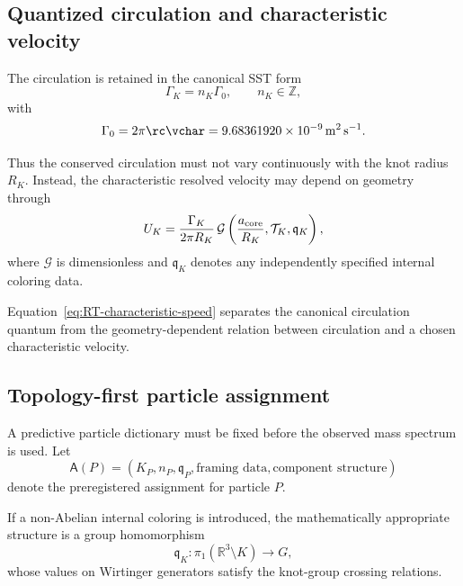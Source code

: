 \subsection{Quantized circulation and characteristic velocity}

The circulation is retained in the canonical SST form
\begin{equation}
\Gamma_K
=
n_K\Gamma_0,
\qquad
n_K\in\mathbb{Z},
\label{eq:RT-circulation-quantization}
\end{equation}
with
\begin{equation}
\Gamma_0
=
2\pi\rc\vchar
=
9.68361920\times10^{-9}\,
\mathrm{m^2\,s^{-1}}.
\label{eq:RT-circulation-quantum}
\end{equation}

Thus the conserved circulation must not vary continuously with the knot
radius \(R_K\).  Instead, the characteristic resolved velocity may depend
on geometry through
\begin{equation}
U_K
=
\frac{\Gamma_K}{2\pi R_K}
\,
\mathcal{G}
\left(
\frac{a_{\rm core}}{R_K},
\mathcal{T}_K,
\mathfrak{q}_K
\right),
\label{eq:RT-characteristic-speed}
\end{equation}
where \(\mathcal{G}\) is dimensionless and \(\mathfrak{q}_K\) denotes any
independently specified internal coloring data.

Equation~\eqref{eq:RT-characteristic-speed} separates the canonical
circulation quantum from the geometry-dependent relation between circulation
and a chosen characteristic velocity.

\subsection{Topology-first particle assignment}

A predictive particle dictionary must be fixed before the observed mass
spectrum is used.  Let
\begin{equation}
\mathsf{A}(P)
=
\left(
K_P,
n_P,
\mathfrak{q}_P,
\text{framing data},
\text{component structure}
\right)
\label{eq:RT-assignment-map}
\end{equation}
denote the preregistered assignment for particle \(P\).

If a non-Abelian internal coloring is introduced, the mathematically
appropriate structure is a group homomorphism
\begin{equation}
\mathfrak{q}_K:
\pi_1
\left(
\mathbb{R}^3\setminus K
\right)
\longrightarrow
G,
\label{eq:RT-coloring-homomorphism}
\end{equation}
whose values on Wirtinger generators satisfy the knot-group crossing
relations.

